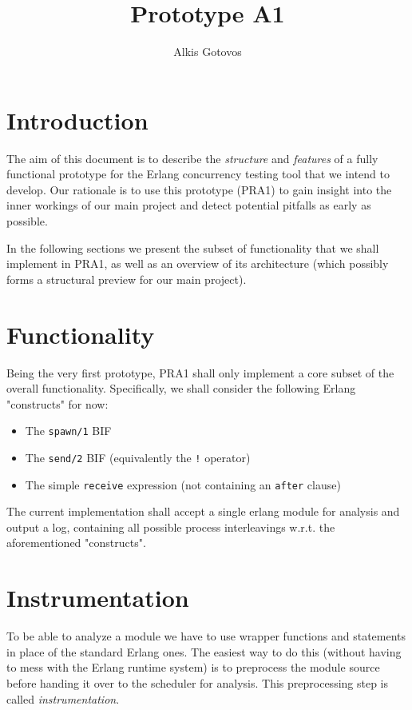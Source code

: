 \documentclass[a4paper,10pt]{article}
\title{Prototype A1}
\author{Alkis Gotovos}
\begin{document}
\lstset{language=Erlang, basicstyle=\small \ttfamily}

\begin{titlepage}
\maketitle
\thispagestyle{empty}
\end{titlepage}

\section{Introduction}
The aim of this document is to describe the \emph{structure} and \emph{features}
of a fully functional prototype for the Erlang concurrency testing tool that we
intend to develop. Our rationale is to use this prototype (PRA1) to gain insight
into the inner workings of our main project and detect potential pitfalls
as early as possible.

In the following sections we present the subset of functionality that we
shall implement in PRA1, as well as an overview of its architecture
(which possibly forms a structural preview for our main project).

\section{Functionality}
Being the very first prototype, PRA1 shall only implement a core subset of the
overall functionality. Specifically, we shall consider the following Erlang
"constructs" for now:
\begin{itemize}
	\item The \lstinline+spawn/1+ BIF
	\item The \lstinline+send/2+ BIF (equivalently the \lstinline+!+ operator)
	\item The simple \lstinline+receive+ expression (not containing an \lstinline+after+ clause)
\end{itemize}

The current implementation shall accept a single erlang module for analysis
and output a log, containing all possible process interleavings
w.r.t. the aforementioned "constructs".

\section{Instrumentation}
To be able to analyze a module we have to use wrapper functions and statements in place of
the standard Erlang ones. The easiest way to do this (without having to mess with the Erlang runtime system)
is to preprocess the module source before handing it over to the scheduler for analysis. This preprocessing
step is called \emph{instrumentation}.
\end{document}
